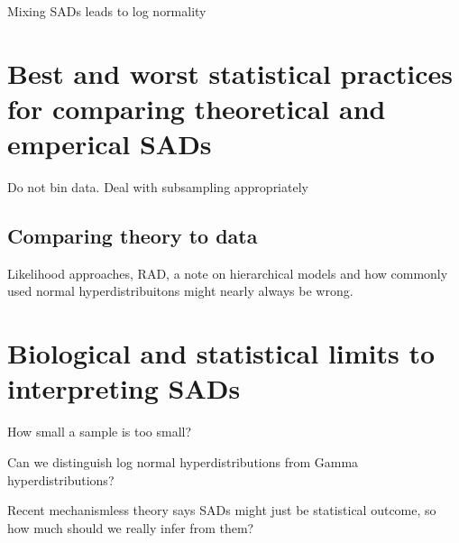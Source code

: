 \documentclass[12pt]{article}
\begin{document}
Mixing SADs leads to log normality

\section{Best and worst statistical practices for comparing
  theoretical and emperical SADs}
\label{sec:statPrac}

Do not bin data. Deal with subsampling appropriately

\subsection{Comparing theory to data}
Likelihood approaches, RAD, a note on hierarchical models and how
commonly used normal hyperdistribuitons might nearly always be wrong.

\section{Biological and statistical limits to interpreting SADs}

How small a sample is too small?

Can we distinguish log normal hyperdistributions from Gamma
hyperdistributions?

Recent mechanismless theory says SADs might just be statistical
outcome, so how much should we really infer from them?
\end{document}

